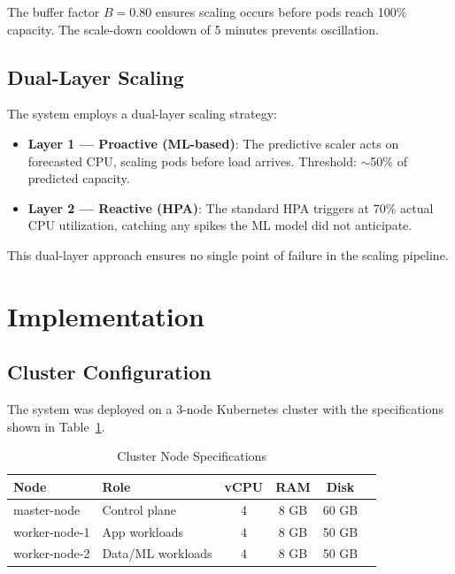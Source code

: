 \documentclass[journal]{IEEEtran}
\begin{document}
The buffer factor $B = 0.80$ ensures scaling occurs before pods reach 100\% capacity. The scale-down cooldown of 5 minutes prevents oscillation.

\subsection{Dual-Layer Scaling}
The system employs a dual-layer scaling strategy:
\begin{itemize}
    \item \textbf{Layer 1 --- Proactive (ML-based)}: The predictive scaler acts on forecasted CPU, scaling pods before load arrives. Threshold: $\sim$50\% of predicted capacity.
    \item \textbf{Layer 2 --- Reactive (HPA)}: The standard HPA triggers at 70\% actual CPU utilization, catching any spikes the ML model did not anticipate.
\end{itemize}

This dual-layer approach ensures no single point of failure in the scaling pipeline.

\section{Implementation}
\label{sec:implementation}

\subsection{Cluster Configuration}
The system was deployed on a 3-node Kubernetes cluster with the specifications shown in Table~\ref{tab:cluster}.

\begin{table}[h]
\centering
\caption{Cluster Node Specifications}
\label{tab:cluster}
\begin{tabular}{@{}llcccc@{}}
\toprule
\textbf{Node} & \textbf{Role} & \textbf{vCPU} & \textbf{RAM} & \textbf{Disk} \\
\midrule
master-node & Control plane & 4 & 8 GB & 60 GB \\
worker-node-1 & App workloads & 4 & 8 GB & 50 GB \\
worker-node-2 & Data/ML workloads & 4 & 8 GB & 50 GB \\
\bottomrule
\end{tabular}
\end{table}
\end{document}
